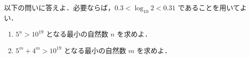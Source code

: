 ﻿\documentclass[../../../uem_mat_tok_q.tex]{subfiles}
\begin{document}
    以下の問いに答えよ．必要ならば，$0.3<\log_{10}2<0.31$ であることを用いてよい．

    \begin{enumerate}
        \item $5^n>10^{19}$ となる最小の自然数 $n$ を求めよ．
        \item $5^m+4^m>10^{19}$ となる最小の自然数 $m$ を求めよ．
    \end{enumerate}
\end{document}
